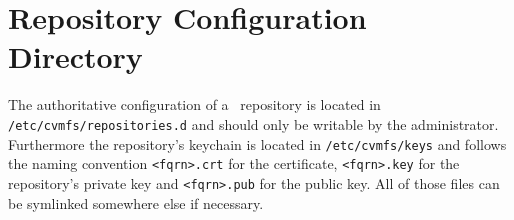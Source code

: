 \pagebreak

\section{Repository Configuration Directory}
The authoritative configuration of a \cvmfs\ repository is located in \texttt{/etc/cvmfs/repositories.d} and should only be writable by the administrator.
Furthermore the repository's keychain is located in \texttt{/etc/cvmfs/keys} and follows the naming convention \texttt{<fqrn>.crt} for the certificate, \texttt{<fqrn>.key} for the repository's private key and \texttt{<fqrn>.pub} for the public key.
All of those files can be symlinked somewhere else if necessary.

\pagebreak
